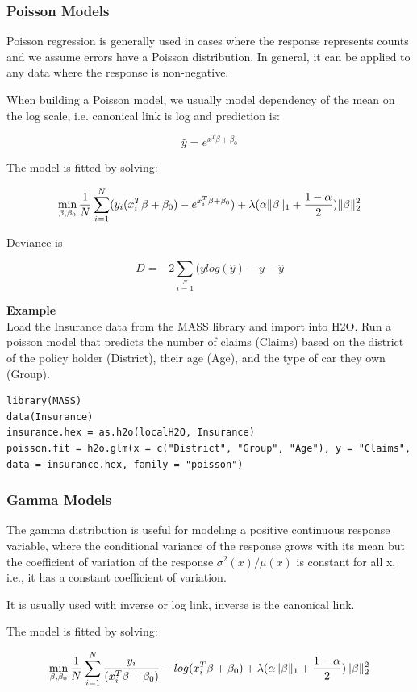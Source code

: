 \documentclass[11pt]{article}
\begin{document}
\subsubsection{Poisson Models}
Poisson regression is generally used in cases where the response represents counts and we assume errors have a Poisson distribution. In general, it can be applied to any data where the response is non-negative. 

When building a Poisson model, we usually model dependency of the mean on the log scale, i.e. canonical link is log and prediction is:

\[\hat{y} = e^{x^T\beta + \beta_0}\]

The model is fitted by solving:

\[  \min\limits_{\beta,\beta_0} { {1 \over N}\sum\limits_{i=1}\limits^{N}(y_i (x_i^{T}\beta  + \beta_0) - e^{x_i^{T}\beta  + \beta_0})  + \lambda (\alpha \|\beta \|_1 + {1-\alpha \over 2}) \| \beta \|_2^2} \]

Deviance is 

\[D = -2\sum\limits_{i=1}\limits^{N}{(y log(\hat{y}) - y - \hat{y}}\]

\textbf{Example}\\

Load the Insurance data from the MASS library and import into H2O. Run a poisson model that predicts the number of claims (Claims) based on the district of the policy holder (District), their age (Age), and the type of car they own (Group).
\begin{lstlisting}[style=R]
library(MASS)
data(Insurance)
insurance.hex = as.h2o(localH2O, Insurance)
poisson.fit = h2o.glm(x = c("District", "Group", "Age"), y = "Claims", data = insurance.hex, family = "poisson")
\end{lstlisting}

\subsubsection{Gamma Models}
The gamma distribution is useful for modeling a positive continuous response variable, where the conditional variance of the response grows with its mean but  the coefficient of variation of the response $\sigma^2(x)/μ(x)$ is constant for all x,  i.e., it has a constant coefficient of variation.

It is usually used with inverse or log link, inverse is the canonical link.

The model is fitted by solving:

\[  \min\limits_{\beta,\beta_0} { {1 \over N}\sum\limits_{i=1}\limits^{N}{y_i \over (x_i^{T}\beta  + \beta_0)} - log({x_i^{T}\beta  + \beta_0})  + \lambda (\alpha \|\beta \|_1 + {1-\alpha \over 2}) \| \beta \|_2^2} \]
\end{document}
